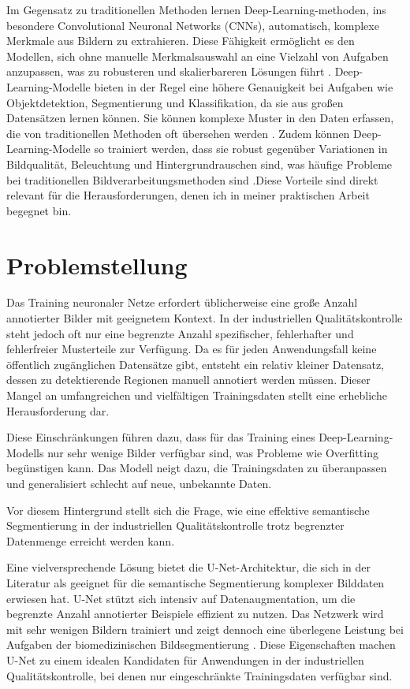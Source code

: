 Im Gegensatz zu traditionellen Methoden lernen Deep-Learning-methoden, ins besondere Convolutional Neuronal Networks (CNNs),  automatisch, komplexe Merkmale aus Bildern zu extrahieren. Diese Fähigkeit ermöglicht es den Modellen, sich ohne manuelle Merkmalsauswahl an eine Vielzahl von Aufgaben anzupassen, was zu robusteren und skalierbareren Lösungen führt \cite{mo_review_2022}. Deep-Learning-Modelle bieten in der Regel eine höhere Genauigkeit bei Aufgaben wie Objektdetektion, Segmentierung und Klassifikation, da sie aus großen Datensätzen lernen können. Sie können komplexe Muster in den Daten erfassen, die von traditionellen Methoden oft übersehen werden \cite{zhao_object_2019}. Zudem können Deep-Learning-Modelle so trainiert werden, dass sie robust gegenüber Variationen in Bildqualität, Beleuchtung und Hintergrundrauschen sind, was häufige Probleme bei traditionellen Bildverarbeitungsmethoden sind \cite{liu_deep_2023}.Diese Vorteile sind direkt relevant für die Herausforderungen, denen ich in meiner praktischen Arbeit begegnet bin.

\section{Problemstellung}
Das Training neuronaler Netze erfordert üblicherweise eine große Anzahl annotierter Bilder mit geeignetem Kontext. In der industriellen Qualitätskontrolle steht jedoch oft nur eine begrenzte Anzahl spezifischer, fehlerhafter und fehlerfreier Musterteile zur Verfügung. Da es für jeden Anwendungsfall keine öffentlich zugänglichen Datensätze gibt, entsteht ein relativ kleiner Datensatz, dessen zu detektierende Regionen manuell annotiert werden müssen. Dieser Mangel an umfangreichen und vielfältigen Trainingsdaten stellt eine erhebliche Herausforderung dar.

Diese Einschränkungen führen dazu, dass für das Training eines Deep-Learning-Modells nur sehr wenige Bilder verfügbar sind, was Probleme wie Overfitting begünstigen kann. Das Modell neigt dazu, die Trainingsdaten zu überanpassen und generalisiert schlecht auf neue, unbekannte Daten.\cite{lecun_deep_2015}

Vor diesem Hintergrund stellt sich die Frage, wie eine effektive semantische Segmentierung in der industriellen Qualitätskontrolle trotz begrenzter Datenmenge erreicht werden kann.

Eine vielversprechende Lösung bietet die U-Net-Architektur, die sich in der Literatur als geeignet für die semantische Segmentierung komplexer Bilddaten erwiesen hat. U-Net stützt sich intensiv auf Datenaugmentation, um die begrenzte Anzahl annotierter Beispiele effizient zu nutzen. Das Netzwerk wird mit sehr wenigen Bildern trainiert und zeigt dennoch eine überlegene Leistung bei Aufgaben der biomedizinischen Bildsegmentierung \cite{ronneberger_u-net_2015}. Diese Eigenschaften machen U-Net zu einem idealen Kandidaten für Anwendungen in der industriellen Qualitätskontrolle, bei denen nur eingeschränkte Trainingsdaten verfügbar sind.

